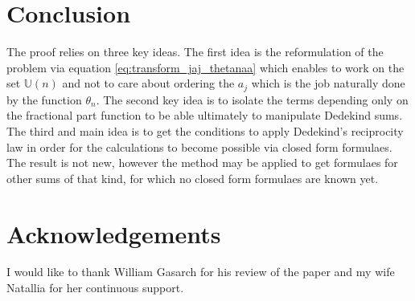 \documentclass[a4paper,12pt]{article}
\newcommand{\setU}[1]{\mathbb{U}\left( #1 \right)}
\begin{document}
\section{Conclusion}

The proof relies on three key ideas. The first idea is the reformulation of the problem via equation \ref{eq:transform_jaj_thetanaa} which enables to work on the set $\setU{n}$ and not to care about ordering the $a_j$ which is the job naturally done by the function $\theta_n$. The second key idea is to isolate the terms depending only on the fractional part function to be able ultimately to manipulate Dedekind sums. The third and main idea is to get the conditions to apply Dedekind's reciprocity law in order for the calculations to become possible via closed form formulaes. The result is not new, however the method may be applied to get formulaes for other sums of that kind, for which no closed form formulaes are known yet.

\section*{Acknowledgements} 

I would like to thank William Gasarch for his review of the paper and my wife Natallia for her continuous support.



\end{document}
